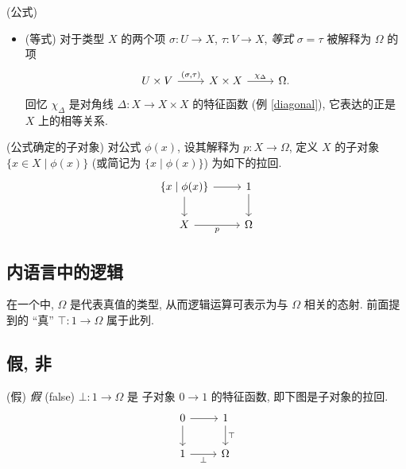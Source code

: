 \begin{definition}
	{(公式)}
	\begin{itemize}
		\item
		(等式) 对于类型 $X$ 的两个项 $\sigma\colon U \to X$, $\tau\colon V \to X$, \emph{等式} $\sigma = \tau$ 被解释为 $\Omega$ 的项
		\[\begin{tikzcd}[ampersand replacement=\&]
			{U\times V} \& {X\times X} \& \Omega.
			\arrow["{(\sigma,\tau)}", from=1-1, to=1-2]
			\arrow["{\chi_{\Delta}}", from=1-2, to=1-3]
		\end{tikzcd}\]
		回忆 $\chi_{\Delta}$ 是对角线 $\Delta\colon X\to X\times X$ 的特征函数 (例 \ref{diagonal}), 它表达的正是 $X$ 上的相等关系.
	\end{itemize}
\end{definition}

\begin{definition}
	{(公式确定的子对象)}
	对公式 $\phi(x)$, 设其解释为 $p\colon X\to\Omega$, 定义 $X$ 的子对象 $\{x\in X \mid \phi(x)\}$ (或简记为 $\{x\mid \phi(x)\}$) 为如下的拉回.
	\[
	\begin{tikzcd}
		\{x\mid \phi(x)\}\ar[r]\ar[d] & 1\ar[d] \\
		X \ar[r,"p"'] & \Omega
	\end{tikzcd}
	\]
\end{definition}



\subsection{内语言中的逻辑}


在一个\topos{}中, $\Omega$ 是代表真值的类型, 从而逻辑运算可表示为与 $\Omega$ 相关的态射. 前面提到的 ``真'' $\top \colon 1 \to \Omega$ 属于此列.

\subsection{假, 非}

\begin{definition}
	{(假)}
	\emph{假} (false) $\bot \colon 1 \to \Omega$ 是 子对象 $0\to 1$ 的特征函数, 即下图是子对象的拉回.
	\[\begin{tikzcd}[ampersand replacement=\&]
		0 \& 1 \\
		1 \& \Omega
		\arrow[from=1-1, to=2-1]
		\arrow[from=1-1, to=1-2]
		\arrow["\bot"', from=2-1, to=2-2]
		\arrow["\top", from=1-2, to=2-2]
	\end{tikzcd}\]
\end{definition}


